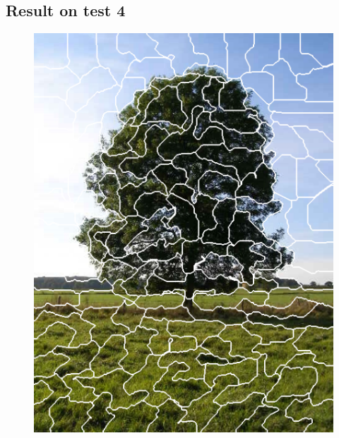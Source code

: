 \documentclass[a4paper,titlepaget]{article}
\begin{document}
\subsection{Result on test 4}
\begin{figure}[htpb] 
	\centering
	\begin{minipage}{.3\textwidth}
		\includegraphics[width=1.2\textwidth]{images/results/4seg} 
	\end{minipage}
	\hspace{.15\textwidth}
	\begin{minipage}{.3\textwidth}

\end{minipage}
\end{figure}
\end{document}
